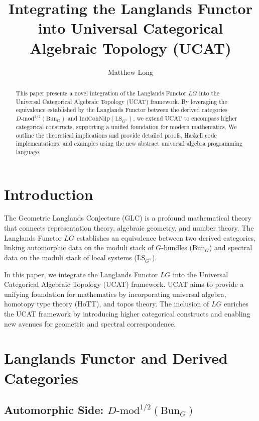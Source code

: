 \documentclass{article}
\title{Integrating the Langlands Functor into Universal Categorical Algebraic Topology (UCAT)}
\author{Matthew Long}
\date{}
\begin{document}
\maketitle

\begin{abstract}
This paper presents a novel integration of the Langlands Functor \( LG \) into the Universal Categorical Algebraic Topology (UCAT) framework. By leveraging the equivalence established by the Langlands Functor between the derived categories \( D\text{-mod}^{1/2}(\text{Bun}_G) \) and \( \text{IndCohNilp}(\text{LS}_{G^{\vee}}) \), we extend UCAT to encompass higher categorical constructs, supporting a unified foundation for modern mathematics. We outline the theoretical implications and provide detailed proofs, Haskell code implementations, and examples using the new abstract universal algebra programming language.
\end{abstract}

\tableofcontents

\section{Introduction}

The Geometric Langlands Conjecture (GLC) is a profound mathematical theory that connects representation theory, algebraic geometry, and number theory. The Langlands Functor \( LG \) establishes an equivalence between two derived categories, linking automorphic data on the moduli stack of \( G \)-bundles (\( \text{Bun}_G \)) and spectral data on the moduli stack of local systems (\( \text{LS}_{G^{\vee}} \)).

In this paper, we integrate the Langlands Functor \( LG \) into the Universal Categorical Algebraic Topology (UCAT) framework. UCAT aims to provide a unifying foundation for mathematics by incorporating universal algebra, homotopy type theory (HoTT), and topos theory. The inclusion of \( LG \) enriches the UCAT framework by introducing higher categorical constructs and enabling new avenues for geometric and spectral correspondence.

\section{Langlands Functor and Derived Categories}

\subsection{Automorphic Side: \( D\text{-mod}^{1/2}(\text{Bun}_G) \)}
\end{document}
